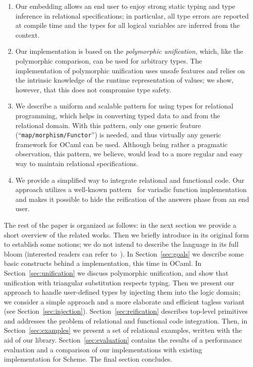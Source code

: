 \begin{enumerate}
\item Our embedding allows an end user to enjoy strong static typing and type inference in relational
specifications; in particular, all type errors are reported at compile time and the types for
all logical variables are inferred from the context.

\item Our implementation is based on the \emph{polymorphic unification}, which, like the polymorphic comparison,
can be used for arbitrary types. The implementation of polymorphic unification uses unsafe features and
relies on the intrinsic knowledge of the runtime representation of values; we show, however, that this does not
compromise type safety.

\item We describe a uniform and scalable pattern for using types for relational programming, which
helps in converting typed data to and from the relational domain. With this pattern, only one
generic feature (``\lstinline{map/morphism/Functor}'') is needed, and thus virtually any generic
framework for OCaml can be used. Although being rather a pragmatic observation, this pattern, we
believe, would lead to a more regular and easy way to maintain relational specifications.

\item We provide a simplified way to integrate relational and functional code. Our approach utilizes
a well-known pattern~\cite{Unparsing, DoWeNeed} for variadic function implementation and makes it
possible to hide the reification of the answers phase from an end user.
\end{enumerate}

The rest of the paper is organized as follows: in the next section we provide a short overview of the related
works. Then we briefly introduce \miniKanren in
its original form to establish some notions; we do not intend to describe the language in its full bloom (interested readers can
refer to~\cite{TRS}). In Section~\ref{sec:goals} we describe some basic constructs behind a \miniKanren implementation, this time
in OCaml. In Section~\ref{sec:unification} we discuss polymorphic unification, and show that unification with
triangular substitution respects typing. Then we present our approach to handle user-defined types by injecting them
into the logic domain; we consider a simple approach and a more elaborate and efficient tagless variant (see Section~\ref{sec:injection}).
Section~\ref{sec:reification} describes top-level primitives and addresses the problem of relational and functional code integration.
Then, in Section~\ref{sec:examples} we present a set of relational examples, written with the aid of our
library. Section~\ref{sec:evaluation} contains the results of a performance evaluation and a comparison of our implementations
with existing implementation for Scheme. The final section concludes.

